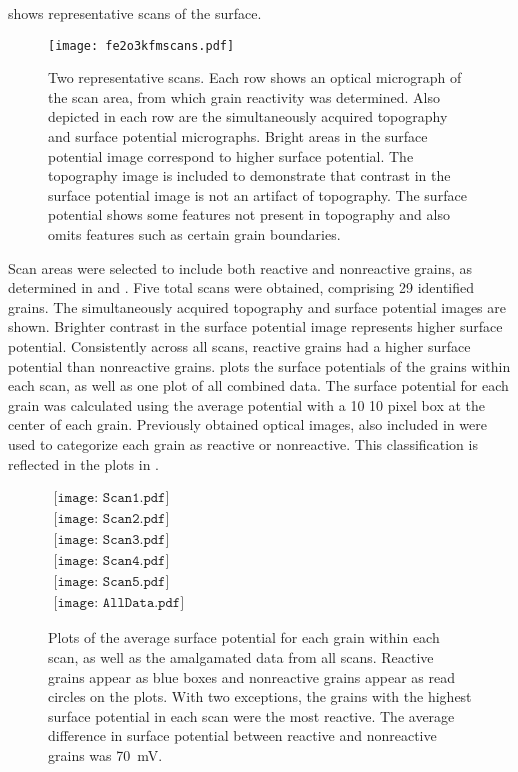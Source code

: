  shows representative  scans of the  surface. 
\begin{figure}
	\texttt{[image: fe2o3kfmscans.pdf]}
	\caption[Two representative  scans]{%
		Two representative  scans. Each row shows an optical micrograph of the scan area, 
		from which grain reactivity was determined. Also depicted in each row are the simultaneously 
		acquired topography and surface potential micrographs. Bright areas in the surface 
		potential image correspond to higher surface potential. The topography image is included 
		to demonstrate that contrast in the surface potential image is not an artifact of topography. 
		The surface potential shows some features not present in topography and also omits features 
		such as certain grain boundaries.}
	\label{fig:fe2o3kfmscans}
\end{figure}
Scan areas were selected to include both reactive and nonreactive grains, as determined in  and . Five total scans were obtained, comprising 29 identified grains. The simultaneously acquired topography and surface potential images are shown. Brighter contrast in the surface potential image represents higher surface potential. Consistently across all scans, reactive grains had a higher surface potential than nonreactive grains.  plots the surface potentials of the grains within each scan, as well as one plot of all combined data. The surface potential for each grain was calculated using the average potential with a 10 \texttimes{} 10 pixel box at the center of each grain. Previously obtained optical images, also included in  were used to categorize each grain as reactive or nonreactive. This classification is reflected in the plots in .
\begin{figure}
\centering
$\begin{array}{cc}
\texttt{[image: Scan1.pdf]} \\ 
\texttt{[image: Scan2.pdf]} \\ 
\texttt{[image: Scan3.pdf]} \\ 
\texttt{[image: Scan4.pdf]} \\ 
\texttt{[image: Scan5.pdf]} \\ 
\texttt{[image: AllData.pdf]}
\end{array}$
\caption[Average surface potential for each grain]{Plots of the average surface potential for each grain within each scan, as well as the amalgamated data from all scans. Reactive grains appear as blue boxes and nonreactive grains appear as read circles on the plots. With two exceptions, the grains with the highest surface potential in each scan were the most reactive. The average difference in surface potential between reactive and nonreactive grains was \SI{70}{\milli\volt}.}
\label{fig:fe2o3kfmplots}
\end{figure}
